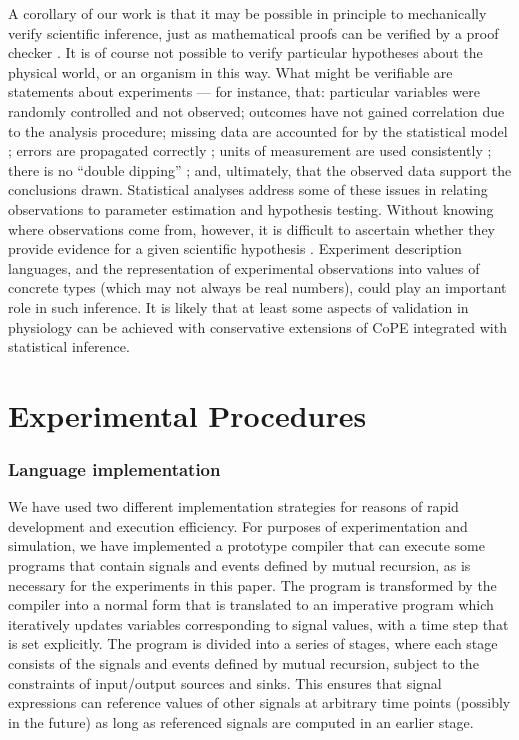 A corollary of our work is that it may be possible in principle to
mechanically verify scientific inference, just as mathematical proofs
can be verified by a proof checker \citep{DeBruijn1968,
  Harrison2009}. It is of course not possible to verify particular
hypotheses about the physical world, or an organism in this way. What
might be verifiable are statements about experiments --- for instance,
that: particular variables were randomly controlled and not observed;
outcomes have not gained correlation due to the analysis procedure;
missing data are accounted for by the statistical model
\citep{Gelman2003}; errors are propagated correctly \citep{Taylor1997};
units of measurement are used consistently \citep{Kennedy1997}; there
is no ``double dipping'' \citep{Kriegeskorte2009}; and, ultimately,
that the observed data support the conclusions drawn. Statistical
analyses address some of these issues in relating observations to
parameter estimation and hypothesis testing. Without knowing
where observations come from, however, it is difficult to ascertain whether
they provide evidence for a given scientific hypothesis
\citep{Pool2002}. Experiment description languages, and the
representation of experimental observations into values of concrete
types (which may not always be real numbers), could play an important
role in such inference. It is likely that at least some aspects of
validation in physiology can be achieved with conservative extensions
of
CoPE integrated with statistical inference.

\section*{Experimental Procedures}

\subsubsection*{Language implementation}

We have used two different implementation strategies for reasons of
rapid development and execution efficiency. For purposes of
experimentation and simulation, we have implemented a prototype
compiler that can execute some programs that contain signals and
events defined by mutual recursion, as is necessary for the
experiments in this paper. The program is transformed by the compiler
into a normal form that is translated to an imperative program which
iteratively updates variables corresponding to signal values, with a
time step that is set explicitly. The program is divided into a series
of stages, where each stage consists of the signals and events defined
by mutual recursion, subject to the constraints of input/output
sources and sinks. This ensures that signal expressions can reference
values of other signals at arbitrary time points (possibly in the
future) as long as referenced signals are computed in an earlier
stage.

